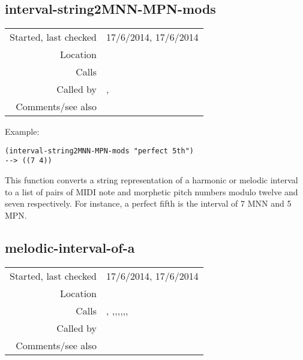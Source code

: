\subsection*{interval-string2MNN-MPN-mods}\label{fun:interval-string2MNN-MPN-mods}

\vspace{0.3cm}
\begin{tabular}{r|p{8cm}}
Started, last checked & 17/6/2014, 17/6/2014 \\
Location & \nameref{sec:pitches-intervals-durations} \\
Calls & \\
Called by & \nameref{fun:harmonic-interval-of-a}, \nameref{fun:melodic-interval-of-a} \\
Comments/see also &
\end{tabular}

\vspace{0.5cm}
\noindent Example:
\begin{verbatim}
(interval-string2MNN-MPN-mods "perfect 5th")
--> ((7 4))
\end{verbatim}

\noindent This function converts a string
representation of a harmonic or melodic interval to
a list of pairs of MIDI note and morphetic pitch
numbers modulo twelve and seven respectively. For
instance, a perfect fifth is the interval of 7 MNN and
5 MPN.


\subsection*{melodic-interval-of-a}\label{fun:melodic-interval-of-a}

\vspace{0.3cm}
\begin{tabular}{r|p{8cm}}
Started, last checked & 17/6/2014, 17/6/2014 \\
Location & \nameref{sec:pitches-intervals-durations} \\
Calls & \nameref{fun:append-list}, \nameref{fun:dataset-restricted-to-m-in-nth},\newline \nameref{fun:interval-string2MNN-MPN-mods},\newline \nameref{fun:modify-question-by-staff-restriction},\newline \nameref{fun:nth-list-of-lists},\newline \nameref{fun:pairs-forming-melodic-interval-of},\newline \nameref{fun:replace-all}, \nameref{fun:split-point-set-by-staff} \\
Called by & \nameref{fun:Stravinsqi-Jun2014} \\
Comments/see also & \nameref{fun:harmonic-interval-of-a}
\end{tabular}

